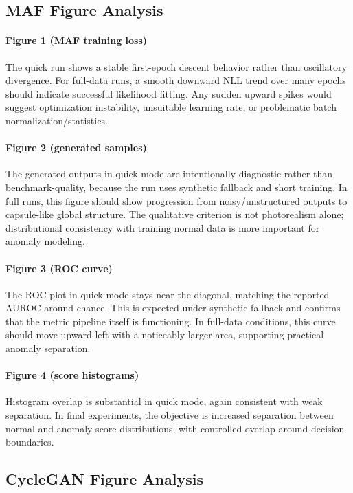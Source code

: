 \documentclass[conference]{IEEEtran}
\begin{document}
\subsection{MAF Figure Analysis}
\paragraph{Figure 1 (MAF training loss)}
The quick run shows a stable first-epoch descent behavior rather than oscillatory divergence. For full-data runs, a smooth downward NLL trend over many epochs should indicate successful likelihood fitting. Any sudden upward spikes would suggest optimization instability, unsuitable learning rate, or problematic batch normalization/statistics.

\paragraph{Figure 2 (generated samples)}
The generated outputs in quick mode are intentionally diagnostic rather than benchmark-quality, because the run uses synthetic fallback and short training. In full runs, this figure should show progression from noisy/unstructured outputs to capsule-like global structure. The qualitative criterion is not photorealism alone; distributional consistency with training normal data is more important for anomaly modeling.

\paragraph{Figure 3 (ROC curve)}
The ROC plot in quick mode stays near the diagonal, matching the reported AUROC around chance. This is expected under synthetic fallback and confirms that the metric pipeline itself is functioning. In full-data conditions, this curve should move upward-left with a noticeably larger area, supporting practical anomaly separation.

\paragraph{Figure 4 (score histograms)}
Histogram overlap is substantial in quick mode, again consistent with weak separation. In final experiments, the objective is increased separation between normal and anomaly score distributions, with controlled overlap around decision boundaries.

\subsection{CycleGAN Figure Analysis}
\end{document}
